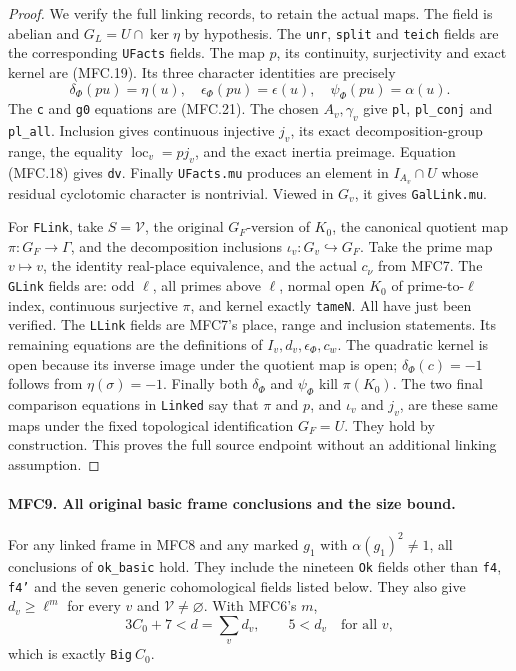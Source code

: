 \begin{proof}
We verify the full linking records, to retain the actual maps.
The field is abelian and \(G_L=U\cap\ker\eta\) by hypothesis.
The \texttt{unr}, \texttt{split} and \texttt{teich} fields are
the corresponding \texttt{UFacts} fields.  The map \(p\), its
continuity, surjectivity and exact kernel are (MFC.19).  Its three
character identities are precisely
\[
 \delta_\Phi(pu)=\eta(u),\quad
 \epsilon_\Phi(pu)=\epsilon(u),\quad
 \psi_\Phi(pu)=\alpha(u).                                 \tag{MFC.22}
\]
The \texttt{c} and \texttt{g0} equations are (MFC.21).
The chosen \(A_v,\gamma_v\) give \texttt{pl}, \texttt{pl\_conj}
and \texttt{pl\_all}.  Inclusion gives continuous injective
\(j_v\), its exact decomposition-group range, the equality
\(\operatorname{loc}_v=pj_v\), and the exact inertia preimage.
Equation (MFC.18) gives \texttt{dv}.  Finally
\texttt{UFacts.mu} produces an element in \(I_{A_v}\cap U\)
whose residual cyclotomic character is nontrivial.  Viewed in
\(G_v\), it gives \texttt{GalLink.mu}.

For \texttt{FLink}, take \(S=\mathcal V\), the original
\(G_F\)-version of \(K_0\), the canonical quotient map
\(\pi:G_F\to\Gamma\), and the decomposition inclusions
\(\iota_v:G_v\hookrightarrow G_F\).  Take the prime map
\(v\mapsto v\), the identity real-place equivalence, and the
actual \(c_\nu\) from MFC7.  The \texttt{GLink} fields are:
odd \(\ell\), all primes above \(\ell\), normal open
\(K_0\) of prime-to-\(\ell\) index, continuous surjective
\(\pi\), and kernel exactly \texttt{tameN}.  All have just
been verified.  The \texttt{LLink} fields are MFC7's place,
range and inclusion statements.  Its remaining equations are
the definitions of \(I_v,d_v,\epsilon_\Phi,c_w\).
The quadratic kernel is open because its inverse image under
the quotient map is open; \(\delta_\Phi(c)=-1\) follows
from \(\eta(\sigma)=-1\).  Finally both \(\delta_\Phi\)
and \(\psi_\Phi\) kill \(\pi(K_0)\).
The two final comparison equations in \texttt{Linked} say
that \(\pi\) and \(p\), and \(\iota_v\) and \(j_v\),
are these same maps under the fixed topological identification
\(G_F=U\).  They hold by construction.  This proves the full
source endpoint without an additional linking assumption.
\end{proof}

\paragraph{MFC9. All original basic frame conclusions and the size bound.}
\label{claim:MFC9}
For any linked frame in MFC8 and any marked
\(g_1\) with \(\alpha(g_1)^2\ne1\), all conclusions of
\texttt{ok\_basic} hold.  They include the nineteen
\texttt{Ok} fields other than \texttt{f4}, \texttt{f4'}
and the seven generic cohomological fields listed below.
They also give \(d_v\ge\ell^m\) for every \(v\) and
\(\mathcal V\ne\varnothing\).  With MFC6's \(m\),
\[
       3C_0+7<d=\sum_vd_v,\qquad5<d_v\quad\text{for all }v,
                                                               \tag{MFC.23}
\]
which is exactly \texttt{Big}\(\ C_0\).

